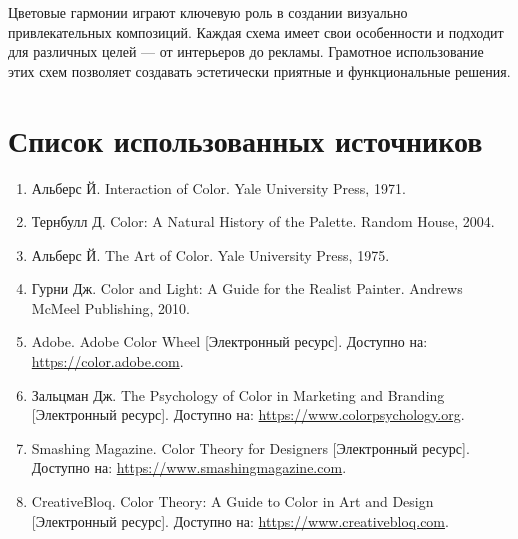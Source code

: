 \documentclass[bachelor, och, referat]{SCWorks}
\begin{document}
\conclusion
Цветовые гармонии играют ключевую роль в создании визуально привлекательных композиций. Каждая схема имеет свои особенности и подходит для различных целей — от интерьеров до рекламы. Грамотное использование этих схем позволяет создавать эстетически приятные и функциональные решения.

\newpage
\section*{Список использованных источников}
\begin{enumerate}
    \item Альберс Й. Interaction of Color. Yale University Press, 1971.
    \item Тернбулл Д. Color: A Natural History of the Palette. Random House, 2004.
    \item Альберс Й. The Art of Color. Yale University Press, 1975.
    \item Гурни Дж. Color and Light: A Guide for the Realist Painter. Andrews McMeel Publishing, 2010.
    \item Adobe. Adobe Color Wheel [Электронный ресурс]. Доступно на: \url{https://color.adobe.com}.
    \item Зальцман Дж. The Psychology of Color in Marketing and Branding [Электронный ресурс]. Доступно на: \url{https://www.colorpsychology.org}.
    \item Smashing Magazine. Color Theory for Designers [Электронный ресурс]. Доступно на: \url{https://www.smashingmagazine.com}.
    \item CreativeBloq. Color Theory: A Guide to Color in Art and Design [Электронный ресурс]. Доступно на: \url{https://www.creativebloq.com}.
\end{enumerate}
\end{document}
